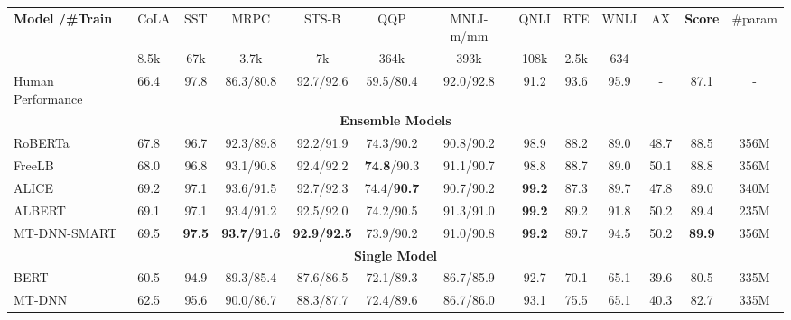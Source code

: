 \documentclass[11pt]{article} \usepackage{url}
\newcommand\model{SMART}
\begin{document}
\begin{table*}[htb!]
\scriptsize
	\begin{center}
		\begin{tabular}{@{\hskip1pt}l@{\hskip1pt}|@{\hskip1pt}l@{\hskip1pt}|@{\hskip1pt}c@{\hskip1pt}|@{\hskip1pt}c@{\hskip1pt}|@{\hskip1pt}c@{\hskip1pt}|@{\hskip1pt}c@{\hskip1pt}|@{\hskip1pt}c|@{\hskip1pt}c|@{\hskip1pt}c |@{\hskip1pt} c |@{\hskip1pt} c|@{\hskip1pt} c |@{\hskip1pt} c@{\hskip1pt}}
			\hline \bf Model /\#Train           &CoLA   &SST  &MRPC       &STS-B      &QQP        &MNLI-m/mm      &QNLI   &RTE    &WNLI   &AX     &\textbf{Score} &\#param\\
		& 8.5k &67k &3.7k &7k &364k &393k &108k &2.5k &634 & & \\ \hline \hline			
            Human Performance           &66.4   &97.8   &86.3/80.8  &92.7/92.6  &59.5/80.4  &92.0/92.8	    &91.2   &93.6   &95.9	&-      &87.1 &- \\ \hline \hline
            \multicolumn{13}{c}{\textbf{Ensemble Models}}\\ \hline	
RoBERTa                 &67.8   &96.7   &92.3/89.8  &92.2/91.9  &74.3/90.2  &90.8/90.2	    &98.9   &88.2   &89.0	&48.7   &88.5 &356M\\ \hline
            FreeLB                  &68.0   &96.8   &93.1/90.8  &92.4/92.2  &\textbf{74.8}/90.3  &91.1/90.7	    &98.8   &88.7   &89.0	&50.1   &88.8 &356M \\ \hline
            ALICE                   &69.2   &97.1   &93.6/91.5  &92.7/92.3  &74.4/\textbf{90.7}  &90.7/90.2	    &\textbf{99.2}   &87.3   &89.7	&47.8   &89.0 &340M\\ \hline
            ALBERT                  &69.1   &97.1   &93.4/91.2  &92.5/92.0  &74.2/90.5  &91.3/91.0	    &\textbf{99.2}   &89.2   &91.8	&50.2   &89.4 &235M\\ \hline 
            MT-DNN-{\model}                   &69.5   &\textbf{97.5}   &\textbf{93.7/91.6}  &\textbf{92.9/92.5}  &73.9/90.2  &91.0/90.8	    &\textbf{99.2}   &89.7   & 94.5	& 50.2  & \textbf{89.9} & 356M\\ \hline \hline
            \multicolumn{13}{c}{\textbf{Single Model}}\\ \hline	
			BERT   &60.5   &94.9   &89.3/85.4  &87.6/86.5  &72.1/89.3  &86.7/85.9      &92.7   &70.1   &65.1	&39.6   &80.5 &335M\\ \hline
            MT-DNN                  &62.5   &95.6   &90.0/86.7  &88.3/87.7  &72.4/89.6  &86.7/86.0	    &93.1   &75.5   &65.1	&40.3   &82.7 &335M\\ \hline

\end{tabular}
\end{center}
\end{table*}
\end{document}
